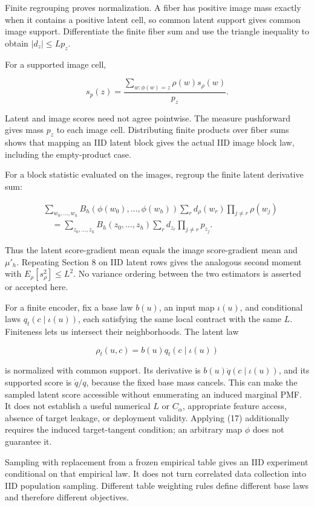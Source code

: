 \documentclass[11pt,a4paper]{article}
\begin{document}
Finite regrouping proves normalization. A fiber has positive image mass exactly when it contains a positive latent cell, so common latent support gives common image support. Differentiate the finite fiber sum and use the triangle inequality to obtain \(|d_z|\le Lp_z\).

For a supported image cell,

\[
s_p(z)=\frac{\sum_{w:\phi(w)=z}\rho(w)s_\rho(w)}{p_z}. \tag{21}
\]

Latent and image scores need not agree pointwise. The measure pushforward gives mass \(p_z\) to each image cell. Distributing finite products over fiber sums shows that mapping an IID latent block gives the actual IID image block law, including the empty-product case.

For a block statistic evaluated on the images, regroup the finite latent derivative sum:

\[
\begin{aligned}
&\sum_{w_0,\ldots,w_h}B_h(\phi(w_0),\ldots,\phi(w_h))
 \sum_r d_\rho(w_r)\prod_{j\ne r}\rho(w_j)\\
&\quad=\sum_{z_0,\ldots,z_h}B_h(z_0,\ldots,z_h)
 \sum_r d_{z_r}\prod_{j\ne r}p_{z_j}.
\end{aligned} \tag{22}
\]

Thus the latent score-gradient mean equals the image score-gradient mean and \(\mu'_h\). Repeating Section 8 on IID latent rows gives the analogous second moment with \(E_\rho[s_\rho^2]\le L^2\). No variance ordering between the two estimators is asserted or accepted here.

For a finite encoder, fix a base law \(b(u)\), an input map \(\iota(u)\), and conditional laws \(q_t(c\mid\iota(u))\), each satisfying the same local contract with the same \(L\). Finiteness lets us intersect their neighborhoods. The latent law

\[
\rho_t(u,c)=b(u)q_t(c\mid\iota(u))
\]

is normalized with common support. Its derivative is \(b(u)\dot q(c\mid\iota(u))\), and its supported score is \(\dot q/q\), because the fixed base mass cancels. This can make the sampled latent score accessible without enumerating an induced marginal PMF. It does not establish a useful numerical \(L\) or \(C_\alpha\), appropriate feature access, absence of target leakage, or deployment validity. Applying (17) additionally requires the induced target-tangent condition; an arbitrary map \(\phi\) does not guarantee it.

Sampling with replacement from a frozen empirical table gives an IID experiment conditional on that empirical law. It does not turn correlated data collection into IID population sampling. Different table weighting rules define different base laws and therefore different objectives.
\end{document}
